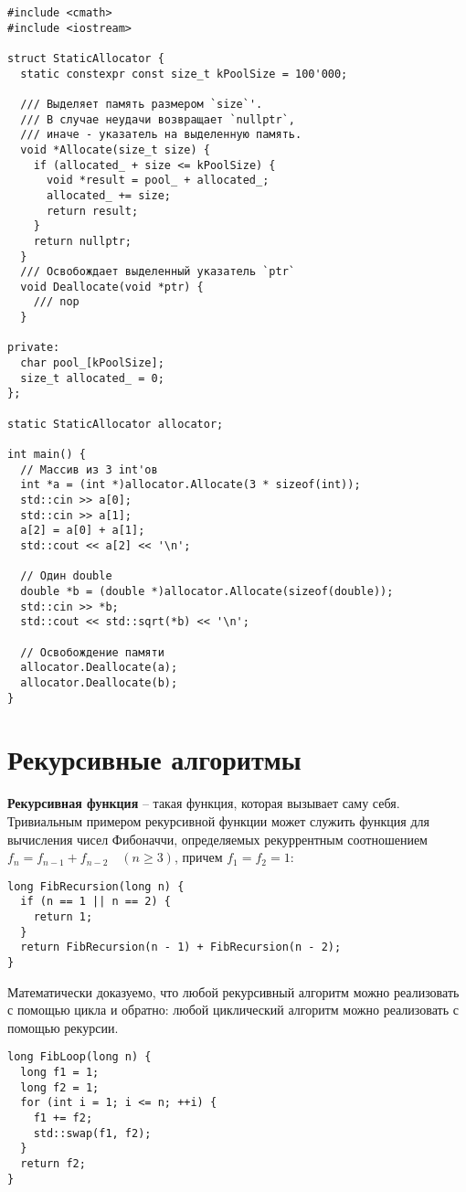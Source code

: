 \begin{verbatim}
#include <cmath>
#include <iostream>

struct StaticAllocator {
  static constexpr const size_t kPoolSize = 100'000;

  /// Выделяет память размером `size`'.
  /// В случае неудачи возвращает `nullptr`,
  /// иначе - указатель на выделенную память.
  void *Allocate(size_t size) {
    if (allocated_ + size <= kPoolSize) {
      void *result = pool_ + allocated_;
      allocated_ += size;
      return result;
    }
    return nullptr;
  }
  /// Освобождает выделенный указатель `ptr`
  void Deallocate(void *ptr) {
    /// nop
  }

private:
  char pool_[kPoolSize];
  size_t allocated_ = 0;
};

static StaticAllocator allocator;

int main() {
  // Массив из 3 int'ов
  int *a = (int *)allocator.Allocate(3 * sizeof(int));
  std::cin >> a[0];
  std::cin >> a[1];
  a[2] = a[0] + a[1];
  std::cout << a[2] << '\n';

  // Один double
  double *b = (double *)allocator.Allocate(sizeof(double));
  std::cin >> *b;
  std::cout << std::sqrt(*b) << '\n';

  // Освобождение памяти
  allocator.Deallocate(a);
  allocator.Deallocate(b);
}
\end{verbatim}

\section{Рекурсивные алгоритмы}
\textbf{Рекурсивная функция} -- такая функция, которая вызывает саму себя.
Тривиальным примером рекурсивной функции может служить функция для вычисления
чисел Фибоначчи, определяемых рекуррентным соотношением $f_n = f_{n-1} + f_{n-2} \quad (n \geq 3)$, причем $f_1 = f_2 = 1$:
\begin{verbatim}
long FibRecursion(long n) {
  if (n == 1 || n == 2) {
    return 1;
  }
  return FibRecursion(n - 1) + FibRecursion(n - 2);
}  
\end{verbatim}

Математически доказуемо, что любой рекурсивный алгоритм можно реализовать с помощью цикла
и обратно: любой циклический алгоритм можно реализовать с помощью рекурсии.

\begin{verbatim}
long FibLoop(long n) {
  long f1 = 1;
  long f2 = 1;
  for (int i = 1; i <= n; ++i) {
    f1 += f2;
    std::swap(f1, f2);
  }
  return f2;
}
\end{verbatim}

